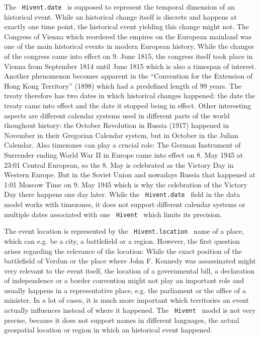 The ~\texttt{Hivent.date}~ is supposed to represent the temporal dimension of an historical event. While an historical change itself is discrete and happens at exactly one time point, the historical event yielding this change might not. The Congress of Vienna which reordered the empires on the European mainland was one of the main historical events in modern European history. While the changes of the congress came into effect on 9. June 1815, the congress itself took place in Vienna from September 1814 until June 1815 which is also a timespan of interest. Another phenomenon becomes apparent in the ``Convention for the Extension of Hong Kong Territory'' (1898) which had a predefined length of 99 years. The treaty therefore has two dates in which historical changes happened: the date the treaty came into effect and the date it stopped being in effect. Other interesting aspects are different calendar systems used in different parts of the world thoughout history: the October Revolution in Russia (1917) happened in November in their Gregorian Calendar system, but in October in the Julian Calendar. Also timezones can play a crucial role: The German Instrument of Surrender ending World War II in Europe came into effect on 8. May 1945 at 23:01 Central European, so the 8. May is celebrated as the Victory Day in Western Europe. But in the Soviet Union and nowadays Russia that happened at 1:01 Moscow Time on 9. May 1945 which is why the celebration of the Victory Day there happens one day later. While the ~\texttt{Hivent.date}~ field in the data model works with timezones, it does not support different calendar systems or multiple dates associated with one ~\texttt{Hivent}~ which limits its precision.

The event location is represented by the ~\texttt{Hivent.location}~ name of a place, which can e.g. be a city, a battlefield or a region. However, the first question arises regarding the relevance of the location: While the exact position of the battlefield of Verdun or the place where John F. Kennedy was assassinated might very relevant to the event itself, the location of a governmental bill, a declaration of independence or a border convention might not play an important role and usually happens in a representative place, e.g. the parliament or the office of a minister. In a lot of cases, it is much more important which territories an event actually influences instead of where it happened. The ~\texttt{Hivent}~ model is not very precise, because it does not support names in different languages, the actual geospatial location or region in which an historical event happened.

